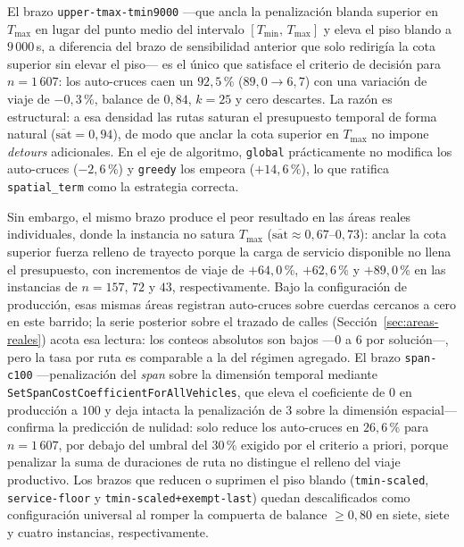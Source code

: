 \begin{enumerate}
El brazo \texttt{upper-tmax-tmin9000} ---que ancla la penalización blanda superior en $T_{\max}$ en
lugar del punto medio del intervalo $[T_{\min},\,T_{\max}]$ y eleva el piso blando a $9\,000$\,s, a
diferencia del brazo de sensibilidad anterior que solo redirigía la cota superior sin elevar el
piso--- es el único que satisface el criterio de decisión para $n=1\,607$: los auto-cruces caen un
$92{,}5$\,\% ($89{,}0 \to 6{,}7$) con una variación de viaje de $-0{,}3$\,\%, balance de $0{,}84$,
$k=25$ y cero descartes. La razón es estructural: a esa densidad las rutas saturan el presupuesto
temporal de forma natural ($\overline{\text{sat}} = 0{,}94$), de modo que anclar la cota superior en
$T_{\max}$ no impone \textit{detours} adicionales. En el eje de algoritmo, \texttt{global}
prácticamente no modifica los auto-cruces ($-2{,}6$\,\%) y \texttt{greedy} los empeora
($+14{,}6$\,\%), lo que ratifica \texttt{spatial\_term} como la estrategia correcta.

Sin embargo, el mismo brazo produce el peor resultado en las áreas reales individuales, donde la
instancia no satura $T_{\max}$ ($\overline{\text{sat}} \approx 0{,}67$--$0{,}73$): anclar la cota
superior fuerza relleno de trayecto porque la carga de servicio disponible no llena el presupuesto,
con incrementos de viaje de $+64{,}0$\,\%, $+62{,}6$\,\% y $+89{,}0$\,\% en las instancias de $n =
157$, $72$ y $43$, respectivamente. Bajo la configuración de producción, esas mismas áreas registran
auto-cruces sobre cuerdas cercanos a cero en este barrido; la serie posterior sobre el trazado de
calles (Sección~\ref{sec:areas-reales}) acota esa lectura: los conteos absolutos son bajos ---0 a 6
por solución---, pero la tasa por ruta es comparable a la del régimen agregado. El
brazo \texttt{span-c100} ---penalización del \textit{span} sobre la dimensión temporal mediante
\texttt{SetSpanCostCoefficientForAllVehicles}, que eleva el coeficiente de $0$ en producción a $100$
y deja intacta la penalización de $3$ sobre la dimensión espacial--- confirma la predicción de
nulidad: solo reduce los auto-cruces en $26{,}6$\,\% para $n=1\,607$, por debajo del umbral del
$30$\,\% exigido por el criterio a priori, porque penalizar la suma de duraciones de ruta no
distingue el relleno del viaje productivo. Los brazos que reducen o suprimen el piso blando
(\texttt{tmin-scaled}, \texttt{service-floor} y \texttt{tmin-scaled+exempt-last}) quedan
descalificados como configuración universal al romper la compuerta de balance $\geq 0{,}80$ en
siete, siete y cuatro instancias, respectivamente.


\end{enumerate}
